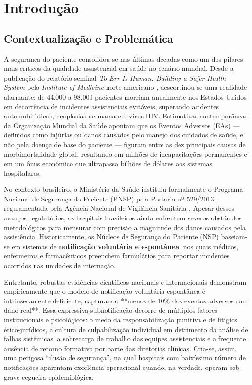 \chapter{Introdução}
\label{cap_introducao}

\section{Contextualização e Problemática}
\label{sec_contexto}

A segurança do paciente consolidou-se nas últimas décadas como um dos pilares mais críticos da qualidade assistencial em saúde no cenário mundial. Desde a publicação do relatório seminal \textit{To Err Is Human: Building a Safer Health System} pelo \textit{Institute of Medicine} norte-americano \cite{kohn2000}, descortinou-se uma realidade alarmante: de 44.000 a 98.000 pacientes morriam anualmente nos Estados Unidos em decorrência de incidentes assistenciais evitáveis, superando acidentes automobilísticos, neoplasias de mama e o vírus HIV. Estimativas contemporâneas da Organização Mundial da Saúde \cite{who2021} apontam que os Eventos Adversos (EAs) — definidos como injúrias ou danos causados pelo manejo dos cuidados de saúde, e não pela doença de base do paciente — figuram entre as dez principais causas de morbimortalidade global, resultando em milhões de incapacitações permanentes e em um ônus econômico que ultrapassa bilhões de dólares aos sistemas hospitalares.

No contexto brasileiro, o Ministério da Saúde instituiu formalmente o Programa Nacional de Segurança do Paciente (PNSP) pela Portaria nº 529/2013 \cite{brasil2013pnsp}, regulamentada pela Agência Nacional de Vigilância Sanitária \cite{anvisa2017}. Apesar desses avanços regulatórios, os hospitais brasileiros ainda enfrentam severos obstáculos metodológicos para mensurar com precisão a magnitude dos danos causados pela assistência. Historicamente, os Núcleos de Segurança do Paciente (NSP) baseiam-se em sistemas de \textbf{notificação voluntária e espontânea}, nos quais médicos, enfermeiros e farmacêuticos preenchem formulários para reportar incidentes ocorridos nas unidades de internação.

Entretanto, robustas evidências científicas nacionais e internacionais \cite{brennan1991, classen2011, landrigan2010} demonstram empiricamente que o modelo de notificação voluntária espontânea é intrinsecamente deficiente, capturando **menos de 10\% dos eventos adversos com dano real**. Essa expressiva subnotificação decorre de múltiplos fatores institucionais e psicológicos: o medo da responsabilização punitiva e de litígios ético-jurídicos, a cultura de culpabilização individual em detrimento da análise de falhas sistêmicas, a sobrecarga de trabalho das equipes assistenciais e a frequente ausência de retorno formativo por parte das diretorias clínicas. Cria-se, assim, uma perigosa ``ilusão de segurança'', na qual hospitais com baixíssimo número de notificações aparentam excelência operacional quando, na verdade, operam sob grave cegueira epidemiológica.

